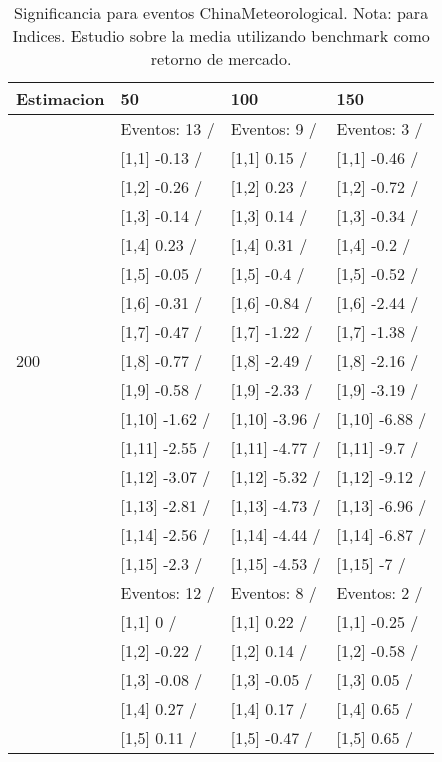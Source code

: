 \begin{table}

\caption{Significancia para eventos ChinaMeteorological. Nota: para Indices. Estudio sobre la media utilizando benchmark como retorno de mercado.}
\centering
\begin{tabular}[t]{llll}
\toprule
Estimacion & 50 & 100 & 150\\
\midrule
 & Eventos:  13 / & Eventos:  9 / & Eventos:  3 /\\
 & {}[1,1] -0.13  / & {}[1,1] 0.15  / & {}[1,1] -0.46  /\\
 & {}[1,2] -0.26  / & {}[1,2] 0.23  / & {}[1,2] -0.72  /\\
 & {}[1,3] -0.14  / & {}[1,3] 0.14  / & {}[1,3] -0.34  /\\
 & {}[1,4] 0.23  / & {}[1,4] 0.31  / & {}[1,4] -0.2  /\\
\addlinespace
 & {}[1,5] -0.05  / & {}[1,5] -0.4  / & {}[1,5] -0.52  /\\
 & {}[1,6] -0.31  / & {}[1,6] -0.84  / & {}[1,6] -2.44  /\\
 & {}[1,7] -0.47  / & {}[1,7] -1.22  / & {}[1,7] -1.38  /\\
200 & {}[1,8] -0.77  / & {}[1,8] -2.49  / & {}[1,8] -2.16  /\\
 & {}[1,9] -0.58  / & {}[1,9] -2.33  / & {}[1,9] -3.19  /\\
\addlinespace
 & {}[1,10] -1.62  / & {}[1,10] -3.96  / & {}[1,10] -6.88  /\\
 & {}[1,11] -2.55  / & {}[1,11] -4.77  / & {}[1,11] -9.7  /\\
 & {}[1,12] -3.07  / & {}[1,12] -5.32  / & {}[1,12] -9.12  /\\
 & {}[1,13] -2.81  / & {}[1,13] -4.73  / & {}[1,13] -6.96  /\\
 & {}[1,14] -2.56  / & {}[1,14] -4.44  / & {}[1,14] -6.87  /\\
\addlinespace
 & {}[1,15] -2.3  / & {}[1,15] -4.53  / & {}[1,15] -7  /\\
 & Eventos:  12 / & Eventos:  8 / & Eventos:  2 /\\
 & {}[1,1] 0  / & {}[1,1] 0.22  / & {}[1,1] -0.25  /\\
 & {}[1,2] -0.22  / & {}[1,2] 0.14  / & {}[1,2] -0.58  /\\
 & {}[1,3] -0.08  / & {}[1,3] -0.05  / & {}[1,3] 0.05  /\\
\addlinespace
 & {}[1,4] 0.27  / & {}[1,4] 0.17  / & {}[1,4] 0.65  /\\
 & {}[1,5] 0.11  / & {}[1,5] -0.47  / & {}[1,5] 0.65  /\\

\end{tabular}
\end{table}
